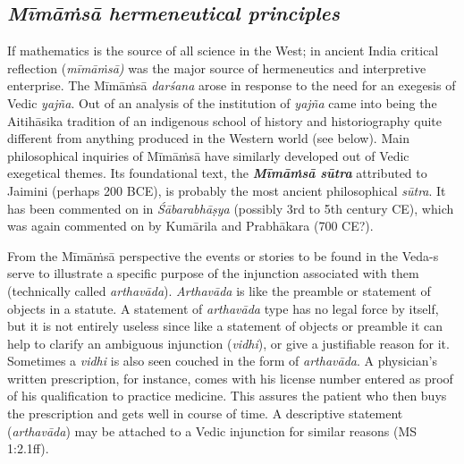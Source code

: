 \subsection*{\textit{Mīmāṁsā hermeneutical principles}}

If mathematics is the source of all science in the West; in ancient India critical reflection (\textit{mīmāṁsā) }was the major source of hermeneutics and interpretive enterprise. The Mīmāṁsā \textit{darśana} arose in response to the need for an exegesis of Vedic \textit{yajña}. Out of an analysis of the institution of \textit{yajña} came into being the Aitihāsika tradition of an indigenous school of history and historiography quite different from anything produced in the Western world (see below). Main philosophical inquiries of Mīmāṁsā have similarly developed out of Vedic exegetical themes. Its foundational text, the \textbf{\textit{Mīmāṁsā sūtra}} attributed to Jaimini (perhaps 200 BCE), is probably the most ancient philosophical \textit{sūtra}. It has been commented on in \textit{Śābarabhāṣya} (possibly 3rd to 5th century CE), which was again commented on by Kumārila and Prabhākara (700 CE?).

From the Mīmāṁsā perspective the events or stories to be found in the Veda-s serve to illustrate a specific purpose of the injunction associated with them (technically called \textit{arthavāda}). \textit{Arthavāda} is like the preamble or statement of objects in a statute. A statement of \textit{arthavāda }type has no legal force by itself, but it is not entirely useless since like a statement of objects or preamble it can help to clarify an ambiguous injunction (\textit{vidhi}), or give a justifiable reason for it. Sometimes a \textit{vidhi} is also seen couched in the form of \textit{arthavāda}. A physician’s written prescription, for instance, comes with his license number entered as proof of his qualification to practice medicine. This assures the patient who then buys the prescription and gets well in course of time. A descriptive statement (\textit{arthavāda}) may be attached to a Vedic injunction for similar reasons (MS 1:2.1ff). 

